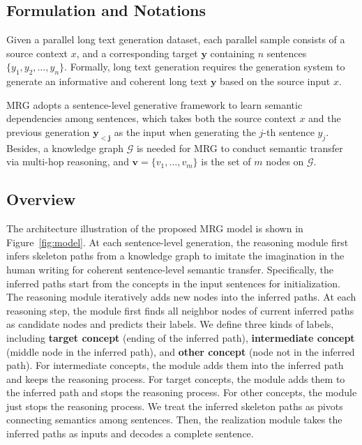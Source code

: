 \documentclass[letterpaper]{article} %
\begin{document}
\subsection{Formulation and Notations}
Given a parallel long text generation dataset, each parallel sample consists of a source context $x$, and a corresponding target $\bm{y}$ containing $n$ sentences $\{y_1, y_2,\dots, y_n\}$. Formally, long text generation requires the generation system to generate an 
informative and coherent
long text $\bm{y}$ based on the source input $x$. %
 
MRG adopts a sentence-level generative framework to learn semantic dependencies among sentences, which takes both the source context $x$ and the previous generation $\bm{y_{<j}}$ as the input when generating the $j$-th sentence $y_j$. Besides, a knowledge graph $\mathcal{G}$ is needed for MRG to conduct semantic transfer via multi-hop reasoning, and $\bm{v}=\{v_1,\dots,v_m\}$ is the set of  $m$ nodes on $\mathcal{G}$.


\subsection{Overview}
The architecture illustration of the proposed MRG model is shown in Figure~\ref{fig:model}. 
At each sentence-level generation,
the reasoning module first infers skeleton paths from a knowledge graph to imitate the imagination in the human writing for coherent sentence-level semantic transfer. 
Specifically, the inferred paths start from the concepts in the input sentences for initialization. The reasoning module iteratively adds new nodes into the inferred paths. At each reasoning step, the module first finds all neighbor nodes of current inferred paths as candidate nodes and predicts their labels. We define three kinds of labels, including \textbf{target concept} (ending of the inferred path), \textbf{intermediate concept} (middle node in the inferred path), and \textbf{other concept} (node not in the inferred path). For intermediate concepts, the module adds them into the inferred path and keeps the reasoning process. 
For target concepts, the module adds them to the inferred path and stops the reasoning process. For other concepts, the module just stops the reasoning process. We treat the inferred skeleton paths as pivots connecting semantics among sentences. Then, the realization module takes the inferred paths as inputs and decodes a complete  sentence. %
\end{document}
